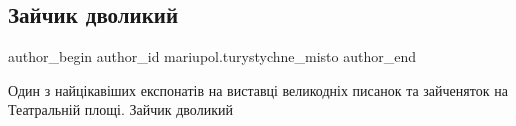  
 
 
 
 

\subsection{Зайчик дволикий}
\label{sec:30_04_2019.fb.mariupol.turystychne_misto.1.zajchik_dvolikij}

\ifcmt
 author_begin
   author_id mariupol.turystychne_misto
 author_end
\fi

Один з найцікавіших експонатів на виставці великодніх писанок та зайченяток на
Театральній площі. Зайчик дволикий 🐇
